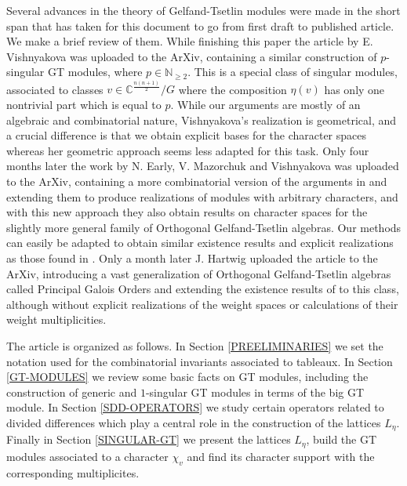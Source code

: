 \documentclass[11pt,fleqn]{article}
\newcommand\NN{\mathbb N}
\newcommand\CC{\mathbb C}
\newcommand\bigmodule{big GT module}
\begin{document}
Several advances in the theory of Gelfand-Tsetlin modules were made in the 
short span that has taken for this document to go from first draft to
published article. We make a brief review of them.
While finishing this paper the article \cite{Vis-geometric-singular-GT} by 
E. Vishnyakova was uploaded to the ArXiv, containing a similar construction
of $p$-singular GT modules, where $p \in \NN_{\geq 2}$. This is a special 
class of singular modules, associated to classes $v \in 
\CC^{\frac{n(n+1)}{2}}/G$ where the composition $\eta(v)$ has only one 
nontrivial part which is equal to $p$. While our arguments are mostly of an
algebraic and combinatorial nature, Vishnyakova's realization is geometrical,
and a crucial difference is that we obtain explicit bases for the character 
spaces whereas her geometric approach seems less adapted for this task. Only 
four months later the work \cite{EMV-orthogonal} by N. Early, V. Mazorchuk and 
Vishnyakova was uploaded to the ArXiv, containing a more combinatorial version 
of the arguments in \cite{Vis-geometric-singular-GT} and extending them to 
produce realizations of modules with arbitrary characters, and with this new 
approach they also obtain results on character spaces for the slightly more 
general family of Orthogonal Gelfand-Tsetlin algebras. Our methods can easily 
be adapted to obtain similar existence results and explicit realizations as 
those found in \cite{EMV-orthogonal}. Only a month later J. Hartwig uploaded 
the article \cite{Hart-rational-galois} to the ArXiv, introducing a vast 
generalization of Orthogonal Gelfand-Tsetlin algebras called Principal Galois 
Orders and extending the existence results of \cite{EMV-orthogonal} to this 
class, although without explicit realizations of the weight spaces or 
calculations of their weight multiplicities.


\bigskip

The article is organized as follows. In Section \ref{PREELIMINARIES} we 
set the notation used for the combinatorial invariants associated to tableaux. 
In Section \ref{GT-MODULES} we review some basic facts on GT modules, including
the construction of generic and $1$-singular GT modules in terms of the
\bigmodule. In Section \ref{SDD-OPERATORS} we study certain operators related
to divided differences which play a central role in the construction of the 
lattices $L_\eta$. Finally in Section \ref{SINGULAR-GT} we present the lattices
$L_\eta$, build the GT modules associated to a character $\chi_v$ and find
its character support with the corresponding multiplicites.
\end{document}
